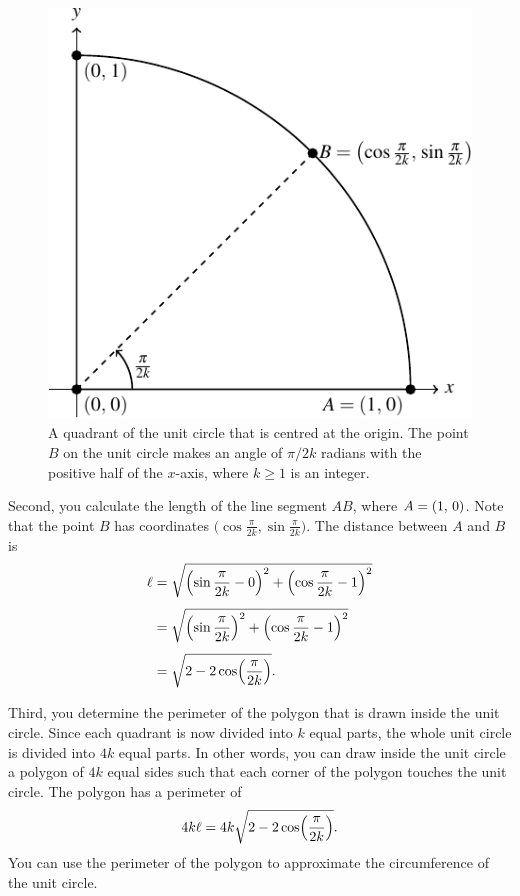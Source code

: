 \documentclass[a4paper,oneside,12pt]{article}
\begin{document}
\begin{figure}[!htbp]
\centering
\includegraphics[scale=1.1]{image/05/quadrant-generic-point.pdf}
\caption{%
  A quadrant of the unit circle that is centred at the origin.  The
  point $B$ on the unit circle makes an angle of $\pi / 2k$ radians
  with the positive half of the $x$-axis, where $k \geq 1$ is an
  integer.
}
\label{fig:quadrant_generic_point}
\end{figure}

Second, you calculate the length of the line segment $AB$, where
$A = \left\lparen{1},\, {0}\right\rparen$.  Note that the point $B$ has coordinates
$\big( \cos\frac{\pi}{2k}\comma \sin\frac{\pi}{2k} \big)$.  The
distance between $A$ and $B$ is
\begin{align*}
\ell
&=
\sqrt{
  \parenthesis*{\sin\frac{\pi}{2k} - 0}^2
  +
  \parenthesis*{\cos\frac{\pi}{2k} -1}^2
} \\[4pt]
&=
\sqrt{
  \parenthesis*{\sin\frac{\pi}{2k}}^2
  +
  \parenthesis*{\cos\frac{\pi}{2k} -1}^2
} \\[4pt]
&=
\sqrt{
  2
  -
  2\cos\parenthesis*{\frac{\pi}{2k}}
}.
\end{align*}

Third, you determine the perimeter of the polygon that is drawn inside
the unit circle.  Since each quadrant is now divided into $k$ equal
parts, the whole unit circle is divided into $4k$ equal parts.  In
other words, you can draw inside the unit circle a polygon of $4k$
equal sides such that each corner of the polygon touches the unit
circle.  The polygon has a perimeter of
\[
4k\ell
=
4k\sqrt{
  2
  -
  2\cos\parenthesis*{\frac{\pi}{2k}}
}.
\]
You can use the perimeter of the polygon to approximate the
circumference of the unit circle.
\end{document}

